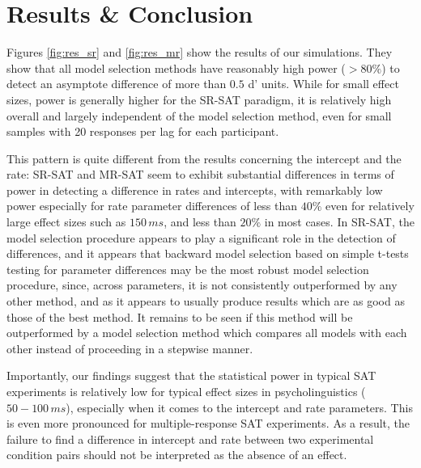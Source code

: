 \documentclass[10pt,letterpaper]{article}
\begin{document}
\section{Results \& Conclusion}\label{results}

Figures \ref{fig:res_sr} and \ref{fig:res_mr} show the results of our simulations. They show that all model selection methods have reasonably high power ($>80\%$) to detect an asymptote difference of more than $0.5$ d' units. While for small effect sizes, power is generally higher for the SR-SAT paradigm, it is relatively high overall and largely independent of the model selection method, 
even for small samples with 20 responses per lag for each participant.

This pattern is quite different from the results concerning the intercept and the rate: SR-SAT and MR-SAT seem to exhibit substantial differences in terms of power in detecting a difference in rates and intercepts, with remarkably low power especially for rate parameter differences of less than $40\%$ even for relatively large effect sizes such as $150\,ms$, and less than $20\%$ in most cases.  
In SR-SAT, the model selection procedure appears to play a significant role in the detection of differences, and it appears that backward model selection based on simple t-tests testing for parameter differences may be the most robust model selection procedure, since, across parameters, it is not consistently outperformed by any other method, and as it appears to usually produce results which are as good as those of the best method. It remains to be seen if this method will be outperformed by a model selection method which compares all models with each other instead of proceeding in a stepwise manner.

Importantly, our findings suggest that the statistical power in typical SAT experiments is relatively low for typical effect sizes in psycholinguistics ($50-100\,ms$), especially when it comes to the intercept and rate parameters. This is even more pronounced for multiple-response SAT experiments. As a result, the failure to find a difference in intercept and rate between two experimental condition pairs should not be interpreted as the absence of an effect.


\end{document}
